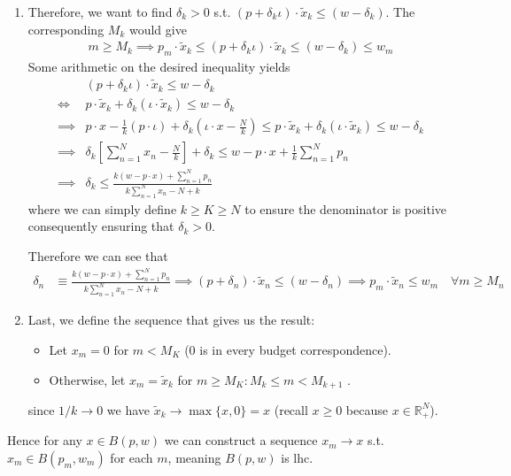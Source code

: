 \documentclass{article}
\theoremstyle{mythm}
\theoremstyle{mydef}
\begin{document}
\begin{enumerate}
  \item Therefore, we want to find $\delta_k > 0$ s.t.  $(p + \delta_k \iota) \cdot \widetilde{x}_k \le (w - \delta_k)$. The corresponding $M_k$ would give
    \begin{align*}
      m \ge M_k
      \implies
      p_m \cdot \widetilde{x}_k
      \le
      (p + \delta_k \iota) \cdot \widetilde{x}_k
      \le
      (w - \delta_k)
      \le
      w_m 
    \end{align*}
    Some arithmetic on the desired inequality yields
    \begin{align*}
        &(p+\delta_k \iota) \cdot \widetilde{x}_k \leq w - \delta_k \\
        \iff& p\cdot \widetilde{x}_k +\delta_k (\iota \cdot \widetilde{x}_k) \leq w - \delta_k \\
        \implies& p\cdot x - \frac{1}{k} (p \cdot \iota) + \delta_k \left(\iota \cdot x - \frac{N}{k}\right) \leq p\cdot \widetilde{x}_k +\delta_k (\iota \cdot \widetilde{x}_k) \leq w - \delta_k \\
        \implies& \delta_k \left[ \sum_{n=1}^N x_n - \frac{N}{k} \right] + \delta_k \leq w - p\cdot x + \frac{1}{k} \sum_{n=1}^N p_n \\
        \implies& \delta_k \leq \frac{k(w - p\cdot x) + \sum_{n=1}^N p_n}{k\sum_{n=1}^N x_n - N + k}
    \end{align*}
    where we can simply define $k \geq K \geq N$ to ensure the denominator is positive consequently ensuring that $\delta_k > 0$. 
    
    Therefore we can see that
    \begin{align*}
      \delta_n
      &
      \equiv
      \frac{k(w - p\cdot x) + \sum_{n=1}^N p_n}{k\sum_{n=1}^N x_n - N + k}
      \implies
      (p + \delta_n) \cdot \widetilde{x}_n
      \le
      (w - \delta_n)
      \implies
      p_m \cdot \widetilde{x}_n
      \le
      w_m
      \quad
      \forall m \ge M_n
    \end{align*}

  \item Last, we define the sequence that gives us the result:
    \begin{itemize}
      \item Let $x_m = 0$ for $m < M_{K}$ ($0$ is in every budget correspondence).

      \item Otherwise, let $x_m = \widetilde{x}_k$ for $m \geq M_K : M_k \le m < M_{k + 1}$ .
    \end{itemize}

    since $1/k \to 0$ we have $\widetilde{x}_k \to \max\{x, 0\} = x$ (recall $x \ge 0$ because $x \in \mathbb{R}^N_+$).
\end{enumerate}

Hence for any $x \in B(p, w)$ we can construct a sequence $x_m \to x$ s.t. $x_m \in B(p_m, w_m)$ for each $m$, meaning $B(p, w)$ is lhc.

\newpage
\printindex
\end{document}
